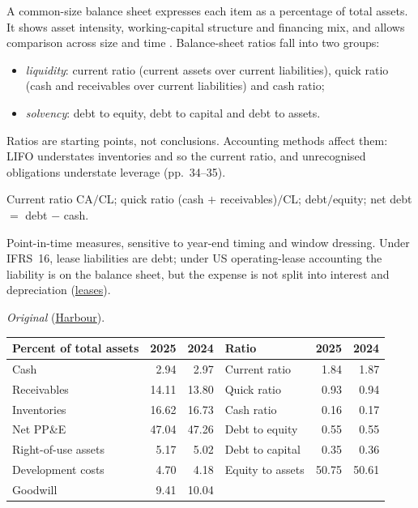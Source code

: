 \begin{qfmethod}\label{meth:balance-sheet-ratios}
 A common-size balance sheet expresses each item as a percentage of total assets. It shows asset intensity, working-capital structure and financing mix, and allows comparison across size and time \citep[pp.~28--33]{financial-statement-analysis-2009}. Balance-sheet ratios fall into two groups:
\begin{itemize}
\item \emph{liquidity}: current ratio (current assets over current liabilities), quick ratio (cash and receivables over current liabilities) and cash ratio;
\item \emph{solvency}: debt to equity, debt to capital and debt to assets.
\end{itemize}
Ratios are starting points, not conclusions. Accounting methods affect them: LIFO understates inventories and so the current ratio, and unrecognised obligations understate leverage (pp.~34--35).

 Current ratio CA$/$CL; quick ratio (cash $+$ receivables)$/$CL; debt$/$equity; net debt $=$ debt $-$ cash.

 Point-in-time measures, sensitive to year-end timing and window dressing. Under IFRS~16, lease liabilities are debt; under US operating-lease accounting the liability is on the balance sheet, but the expense is not split into interest and depreciation (\hyperref[meth:lease-reporting]{leases}).

 \emph{Original} (\hyperref[ex:harbour-tools-statements]{Harbour}).

\begin{center}\small
\begin{tabular}{@{}lrr@{\qquad}lrr@{}}
\toprule
Percent of total assets & 2025 & 2024 & Ratio & 2025 & 2024\\
\midrule
Cash & 2.94 & 2.97 & Current ratio & 1.84 & 1.87\\
Receivables & 14.11 & 13.80 & Quick ratio & 0.93 & 0.94\\
Inventories & 16.62 & 16.73 & Cash ratio & 0.16 & 0.17\\
Net PP\&E & 47.04 & 47.26 & Debt to equity & 0.55 & 0.55\\
Right-of-use assets & 5.17 & 5.02 & Debt to capital & 0.35 & 0.36\\
Development costs & 4.70 & 4.18 & Equity to assets & 50.75 & 50.61\\
Goodwill & 9.41 & 10.04 & & &\\
\bottomrule
\end{tabular}
\end{center}


\end{qfmethod}
